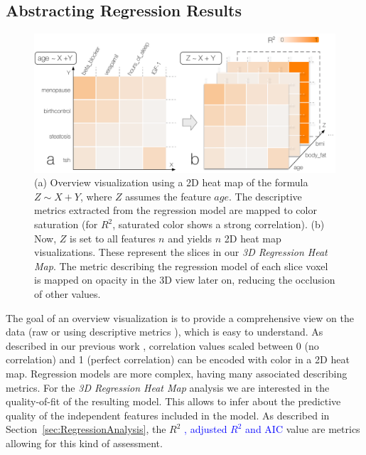 \documentclass[journal]{style/vgtc} 			          %
\newcommand{\add}[1]{\textcolor{blue}{#1}}
\begin{document}
\subsection{Abstracting Regression Results}
\begin{figure}[htb]
 \centering
 \includegraphics[width=1.0\linewidth]{figures/heat_map}
 \caption{
 (a) Overview visualization using a 2D heat map of the formula $Z \sim X + Y$, where $Z$ assumes the feature $age$.
 The descriptive metrics extracted from the regression model are mapped to color saturation (for $R^2$, saturated color shows a strong correlation).
 (b) Now, $Z$ is set to all features $n$ and yields $n$ 2D heat map visualizations.
 These represent the slices in our \emph{3D Regression Heat Map}.
 The metric describing the regression model of each slice voxel is mapped on opacity in the 3D view later on, reducing the occlusion of other values.
 }
  \label{fig:Heat_Map}
\end{figure}
\noindent The goal of an overview visualization is to provide a comprehensive view on the data (raw or using descriptive metrics \cite{Bertini}), which is easy to understand.
As described in our previous work \cite{Klemm2014VIS}, correlation values scaled between 0 (no correlation) and 1 (perfect correlation) can be encoded with color in a 2D heat map.
Regression models are more complex, having many associated describing metrics.
For the \emph{3D Regression Heat Map} analysis we are interested in the quality-of-fit of the resulting model.
This allows to infer about the predictive quality of the independent features included in the model.
As described in Section~\ref{sec:RegressionAnalysis}, the $R^2$ \add{, adjusted $R^2$ and AIC} value are metrics allowing for this kind of assessment.
\end{document}
